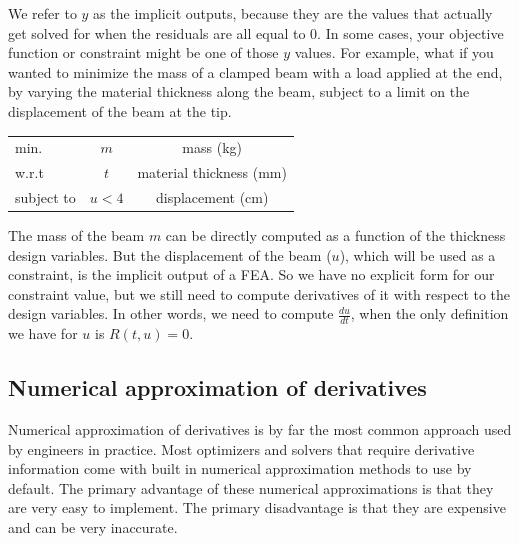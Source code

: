 \documentclass[conf]{new-aiaa}
\begin{document}
    We refer to $y$ as the implicit outputs, because they are the values that actually get solved for when the residuals are all equal to 0.
    In some cases, your objective function or constraint might be one of those $y$ values. 
    For example, what if you wanted to minimize the mass of a clamped beam with a load applied at the end, by varying the material thickness along the beam, subject to a limit on the displacement of the beam at the tip. 
    \begin{table}[H]
        \centering
        \begin{tabular}{lcc}
            \hline
            min. & $m$ & mass (kg)\\
            w.r.t & $t$ & material thickness (mm) \\ 
            subject to & $u < 4$ & displacement (cm)\\ \hline
        \end{tabular}
    \end{table}
    The mass of the beam $m$ can be directly computed as a function of the thickness design variables. 
    But the displacement of the beam ($u$), which will be used as a constraint, is the implicit output of a FEA. 
    So we have no explicit form for our constraint value, but we still need to compute derivatives of it with respect to the design variables. 
    In other words, we need to compute $\frac{du}{dt}$, when the only definition we have for $u$ is $R(t,u)=0$.

    

    \subsection{Numerical approximation of derivatives}
    Numerical approximation of derivatives is by far the most common approach used by engineers in practice. 
    Most optimizers and solvers that require derivative information come with built in numerical approximation methods to use by default. 
    The primary advantage of these numerical approximations is that they are very easy to implement.
    The primary disadvantage is that they are expensive and can be very inaccurate. 
\end{document}
